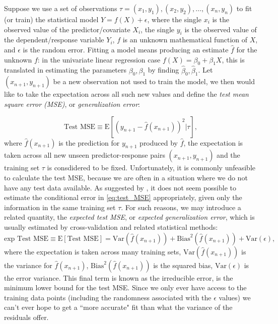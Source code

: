 \documentclass{statsoc}
\begin{document}
Suppose we use a set of observations $\tau=(x_1,y_1),(x_2,y_2),\ldots,(x_n,y_n)$ to fit (or train) the statistical model $Y=f(X)+\epsilon$, where the single $x_i$ is the observed value of the predictor/covariate $X_i$, the single $y_i$ is the observed value of the  dependent/response variable $Y_i$, $f$ is an unknown mathematical function of $X$, and $\epsilon$ is the random error. Fitting a model means producing an estimate $\hat{f}$ for the unknown $f$: in the univariate linear regression case $f(X)= \beta_0+\beta_1X$, this is translated in estimating the parameters $\beta_0,\beta_1$ by finding $\hat{\beta}_0, \hat{\beta}_1$.
Let  $(x_{n+1}, y_{n+1})$ be a new observation not used to train the model, we then would like to take the expectation across all such new values and define the \emph{test mean square error (MSE)}, or \emph{generalization error}:

\begin{equation}
\text{Test MSE} \equiv \textrm{E} \left[ (y_{n+1}-\hat{f}({x}_{n+1}))^2 |\tau \right],
\label{eq:test_MSE}
\end{equation}
%
where $\hat{f}(x_{n+1})$ is the prediction for $y_{n+1}$ produced by $\hat{f}$, the expectation is taken across all new unseen predictor-response pairs $(x_{n+1}, y_{n+1})$ and the training set $\tau$ is consdidered to be fixed. 
Unfortunately, it is commonly unfeasible to calculate the test MSE, because we are often in a situation where we do not have any test data available. As suggested by \cite{hastie2009elements}, it does not seem possible to estimate the conditional error in \eqref{eq:test_MSE} appropriately, given only the information in the same training set $\tau$.  For such reasons, we may introduce a related quantity, the \emph{expected test MSE}, or \emph{expected generalization error}, which is usually estimated by cross-validation \citep{hastie2009elements} and related statistical methods:
\begin{equation}
\text{exp Test MSE}\equiv \textrm{E}[\text{Test MSE}] = 
 \text{Var}(\hat{f}({x}_{n+1}))+ \text{Bias}^2(\hat{f}({x}_{n+1}))+\text{Var}(\epsilon),
\label{eq:exp_test_MSE}
\end{equation}
%
where the expectation is taken across many training sets, $\text{Var}(\hat{f}(x_{n+1}))$ is the variance for $\hat{f}(x_{n+1})$, $\text{Bias}^2(\hat{f}(x_{n+1}))$ is the squared bias,  $\text{Var}(\epsilon)$ is the error variance.  This final term is known as the irreducible error, is the minimum lower bound for the test MSE. Since we only ever have access to the training data points (including the randomness associated with the  $\epsilon$ values) we can't ever hope to get a ``more accurate" fit than what the variance of the residuals offer.
\end{document}
